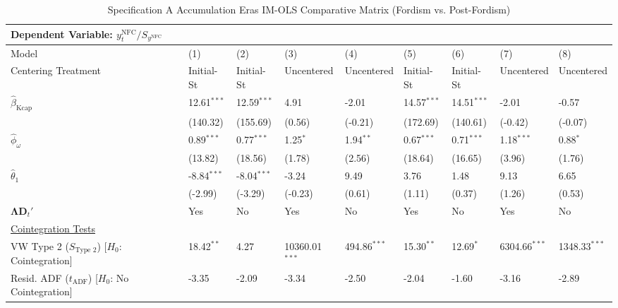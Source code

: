 \begin{landscape}
\begin{table}[H]
\centering
\caption{Specification A Accumulation Eras IM-OLS Comparative Matrix (Fordism vs. Post-Fordism)}
\label{tab:specA_eras}
\small
\begin{tabular}{p{5.2cm}p{1.5cm}p{1.5cm}p{1.5cm}p{1.5cm}p{1.5cm}p{1.5cm}p{1.5cm}p{1.5cm}}
\toprule
\multicolumn{9}{l}{\textbf{Dependent Variable: $y_t^{\text{NFC}} / S_{y^{\text{NFC}}}$}} \\
\midrule
Model & (1) & (2) & (3) & (4) & (5) & (6) & (7) & (8)  \\
Centering Treatment & Initial-St & Initial-St & Uncentered & Uncentered & Initial-St & Initial-St & Uncentered & Uncentered  \\
\midrule
$\hat{\beta}_{\text{Kcap}}$ & 12.61$^{***}$ & 12.59$^{***}$ & 4.91 & -2.01 & 14.57$^{***}$ & 14.51$^{***}$ & -2.01 & -0.57  \\
 & {\scriptsize (140.32)} & {\scriptsize (155.69)} & {\scriptsize (0.56)} & {\scriptsize (-0.21)} & {\scriptsize (172.69)} & {\scriptsize (140.61)} & {\scriptsize (-0.42)} & {\scriptsize (-0.07)}  \\
$\hat{\phi}_{\omega}$ & 0.89$^{***}$ & 0.77$^{***}$ & 1.25$^{*}$ & 1.94$^{**}$ & 0.67$^{***}$ & 0.71$^{***}$ & 1.18$^{***}$ & 0.88$^{*}$  \\
 & {\scriptsize (13.82)} & {\scriptsize (18.56)} & {\scriptsize (1.78)} & {\scriptsize (2.56)} & {\scriptsize (18.64)} & {\scriptsize (16.65)} & {\scriptsize (3.96)} & {\scriptsize (1.76)}  \\
$\hat{\theta}_{1}$ & -8.84$^{***}$ & -8.04$^{***}$ & -3.24 & 9.49 & 3.76 & 1.48 & 9.13 & 6.65  \\
 & {\scriptsize (-2.99)} & {\scriptsize (-3.29)} & {\scriptsize (-0.23)} & {\scriptsize (0.61)} & {\scriptsize (1.11)} & {\scriptsize (0.37)} & {\scriptsize (1.26)} & {\scriptsize (0.53)}  \\
$\boldsymbol{\Lambda} \mathbf{D}_t'$ & Yes & No & Yes & No & Yes & No & Yes & No  \\
\midrule
\multicolumn{9}{l}{\underline{Cointegration Tests}} \\
\makecell[l]{VW Type 2 ($S_{\text{Type 2}}$) \\ {\scriptsize [$H_0$: Cointegration]}} & 18.42$^{**}$ & 4.27 & 10360.01$^{***}$ & 494.86$^{***}$ & 15.30$^{**}$ & 12.69$^{*}$ & 6304.66$^{***}$ & 1348.33$^{***}$  \\
\makecell[l]{Resid. ADF ($t_{\text{ADF}}$) \\ {\scriptsize [$H_0$: No Cointegration]}} & -3.35 & -2.09 & -3.34 & -2.50 & -2.04 & -1.60 & -3.16 & -2.89  \\

\end{tabular}
\end{table}
\end{landscape}
